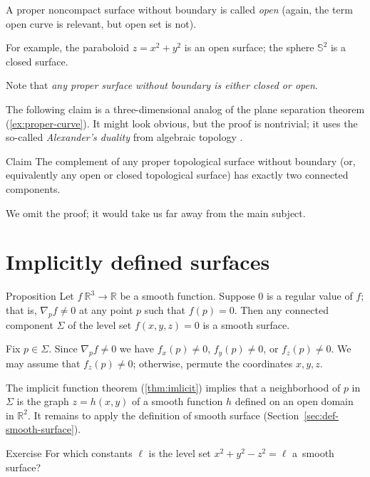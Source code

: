 A proper noncompact surface without boundary is called \emph{open} (again, the term open curve is relevant, but open set is not).

For example, the paraboloid $z=x^2+y^2$
is an open surface; the 
sphere $\mathbb{S}^2$ is a closed surface.

Note that \textit{any proper surface without boundary is either closed or open}.

The following claim is a three-dimensional analog of the plane separation theorem (\ref{ex:proper-curve}).
It might look obvious, but the proof is nontrivial; it uses the so-called {}\emph{Alexander's duality} from algebraic topology \cite{hatcher}.

\begin{thm}{Claim}\label{clm:proper-divides}
The complement of any proper topological surface without boundary (or, equivalently any open or closed topological surface) has exactly two connected components. 
\end{thm}

We omit the proof; it would take us far away from the main subject.

\section{Implicitly defined surfaces}

\begin{thm}{Proposition}\label{prop:implicit-surface}
Let $f\:\mathbb{R}^3\to \mathbb{R}$ be a smooth function.
Suppose $0$ is a regular value of $f$;
that is, $\nabla_p f\ne 0$ at any point $p$ such that $f(p)=0$.
Then any connected component $\Sigma$ of the level set  $f(x,y,z)=0$ is a smooth surface.
\end{thm}

Fix $p\in\Sigma$.
Since $\nabla_p f\ne 0$ we have 
$f_x(p)\ne 0$,
$f_y(p)\ne 0$, or
$f_z(p)\ne 0$.
We may assume that $f_z(p)\ne 0$;
otherwise, permute the coordinates $x,y,z$.

The implicit function theorem (\ref{thm:imlicit}) implies that a neighborhood of $p$ in $\Sigma$ is the graph $z=h(x,y)$ of a smooth function $h$ defined on an open domain in $\mathbb{R}^2$.
It remains to apply the definition of smooth surface (Section~\ref{sec:def-smooth-surface}).
\qeds

\begin{thm}{Exercise}\label{ex:hyperboloids}
For which constants $\ell$ is the level set $x^2+y^2-z^2=\ell$
a~smooth surface?
\end{thm}

